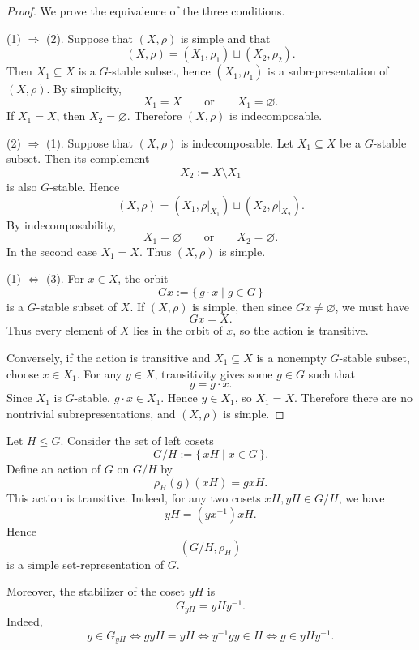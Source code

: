 \begin{proof}
    We prove the equivalence of the three conditions.

    \textup{(1) \(\Rightarrow\) (2).}
    Suppose that \((X,\rho)\) is simple and that
    \[
        (X,\rho)
        =
        (X_1,\rho_1)\sqcup (X_2,\rho_2).
    \]
    Then \(X_1\subseteq X\) is a \(G\)-stable subset, hence
    \((X_1,\rho_1)\) is a subrepresentation of \((X,\rho)\). By simplicity,
    \[
        X_1=X
        \qquad\text{or}\qquad
        X_1=\varnothing.
    \]
    If \(X_1=X\), then \(X_2=\varnothing\). Therefore \((X,\rho)\) is
    indecomposable.

    \textup{(2) \(\Rightarrow\) (1).}
    Suppose that \((X,\rho)\) is indecomposable. Let \(X_1\subseteq X\) be a
    \(G\)-stable subset. Then its complement
    \[
        X_2:=X\setminus X_1
    \]
    is also \(G\)-stable. Hence
    \[
        (X,\rho)
        =
        (X_1,\rho|_{X_1})\sqcup (X_2,\rho|_{X_2}).
    \]
    By indecomposability,
    \[
        X_1=\varnothing
        \qquad\text{or}\qquad
        X_2=\varnothing.
    \]
    In the second case \(X_1=X\). Thus \((X,\rho)\) is simple.

    \textup{(1) \(\Leftrightarrow\) (3).}
    For \(x\in X\), the orbit
    \[
        Gx:=\{\,g\cdot x\mid g\in G\,\}
    \]
    is a \(G\)-stable subset of \(X\). If \((X,\rho)\) is simple, then since
    \(Gx\neq \varnothing\), we must have
    \[
        Gx=X.
    \]
    Thus every element of \(X\) lies in the orbit of \(x\), so the action is
    transitive.

    Conversely, if the action is transitive and \(X_1\subseteq X\) is a nonempty
    \(G\)-stable subset, choose \(x\in X_1\). For any \(y\in X\), transitivity gives
    some \(g\in G\) such that
    \[
        y=g\cdot x.
    \]
    Since \(X_1\) is \(G\)-stable, \(g\cdot x\in X_1\). Hence \(y\in X_1\), so
    \(X_1=X\). Therefore there are no nontrivial subrepresentations, and
    \((X,\rho)\) is simple.
\end{proof}

\begin{example}
    Let \(H\leq G\). Consider the set of left cosets
    \[
        G/H:=\{\,xH\mid x\in G\,\}.
    \]
    Define an action of \(G\) on \(G/H\) by
    \[
        \rho_H(g)(xH)=gxH.
    \]
    This action is transitive. Indeed, for any two cosets \(xH,yH\in G/H\), we have
    \[
        yH=(yx^{-1})xH.
    \]
    Hence
    \[
        (G/H,\rho_H)
    \]
    is a simple set-representation of \(G\).

    Moreover, the stabilizer of the coset \(yH\) is
    \[
        G_{yH}=yHy^{-1}.
    \]
    Indeed,
    \[
        g\in G_{yH}
        \iff
        gyH=yH
        \iff
        y^{-1}gy\in H
        \iff
        g\in yHy^{-1}.
    \]
\end{example}

